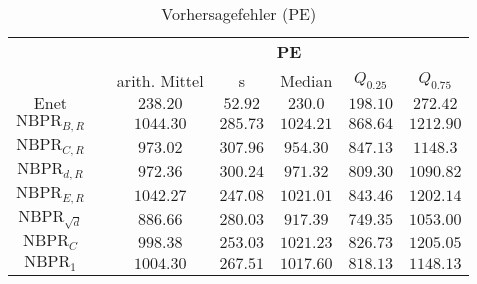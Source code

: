\documentclass{beamer}
\begin{document}
\begin{frame}
\begin{table}[h]
\begin{tabular}{clccccc}
\multicolumn{1}{l}{}     &  & \multicolumn{5}{c}{\textbf{PE}}                                \\ \cline{3-7} 
\multicolumn{1}{l}{}     &  & arith. Mittel & s        & Median    & $Q_{0.25}$ & $Q_{0.75}$ \\ \cline{3-7} 
$\text{Enet}$            &  & $238.20$      & $52.92$  & $230.0$   & $198.10$   & $272.42$   \\
$\text{NBPR}_{B,R}$      &  & $1044.30$     & $285.73$ & $1024.21$ & $868.64$   & $1212.90$  \\
$\text{NBPR}_{C,R}$      &  & $973.02$      & $307.96$ & $954.30$  & $847.13$   & $1148.3$   \\
$\text{NBPR}_{d,R}$      &  & $972.36$      & $300.24$ & $971.32$  & $809.30$   & $1090.82$  \\
$\text{NBPR}_{E,R}$      &  & $1042.27$     & $247.08$ & $1021.01$ & $843.46$   & $1202.14$  \\
$\text{NBPR}_{\sqrt{d}}$ &  & $886.66$      & $280.03$ & $917.39$  & $749.35$   & $1053.00$  \\
$\text{NBPR}_{C}$        &  & $998.38$      & $253.03$ & $1021.23$ & $826.73$   & $1205.05$  \\
$\text{NBPR}_{1}$        &  & $1004.30$     & $267.51$ & $1017.60$ & $818.13$   & $1148.13$ 
\end{tabular}
\caption{Vorhersagefehler (PE)}
\end{table}
\end{frame}
\end{document}

